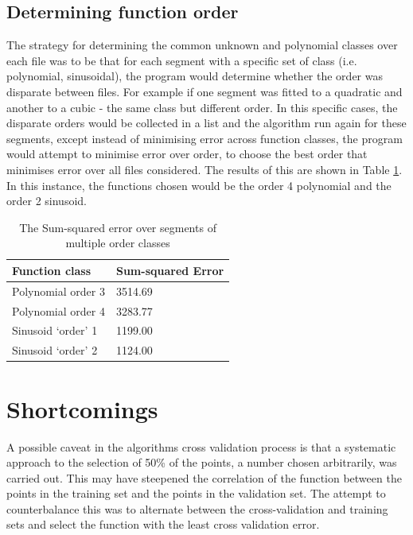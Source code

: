 \documentclass{article}
\newcommand*{\qt}[1]{`#1'}
\begin{document}
\subsection{Determining function order}

The strategy for determining the common unknown and polynomial classes over each file was to be that for each segment with a specific set of class (i.e. polynomial, sinusoidal), the program would determine whether the order was disparate between files. For example if one segment was fitted to a quadratic and another to a cubic - the same class but different order. In this specific cases, the disparate orders would be collected in a list and the algorithm run again for these segments, except instead of minimising error across function classes, the program would attempt to minimise error over order, to choose the best order that minimises error over all files considered. The results of this are shown in Table \ref{tab:order}. In this instance, the functions chosen would be the order 4 polynomial and the order 2 sinusoid.

\begin{table}[!hbt]
  \begin{center}
    \begin{tabular}{| m{10em} | m{9em} |}
      \hline
      Function class        & Sum-squared Error \\ \hline
      Polynomial order 3    & 3514.69           \\ \hline
      Polynomial order 4    & 3283.77           \\ \hline
      Sinusoid \qt{order} 1 & 1199.00           \\ \hline
      Sinusoid \qt{order} 2 & 1124.00           \\ \hline
    \end{tabular}
  \end{center}
  \caption{The Sum-squared error over segments of multiple order classes}
  \label{tab:order}
\end{table}

\section{Shortcomings}

A possible caveat in the algorithms cross validation process is that a systematic approach to the selection of 50\% of the points, a number chosen arbitrarily, was carried out. This may have steepened the correlation of the function between the points in the training set and the points in the validation set. The attempt to counterbalance this was to alternate between the cross-validation and training sets and select the function with the least cross validation error. 
\end{document}
